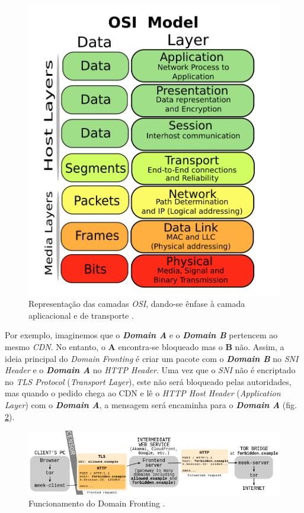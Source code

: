 \begin{figure}[H]
    \begin{center}
        \includegraphics[width=12cm]{img/OSI.png}
        \caption{Representação das camadas \textit{OSI}, dando-se ênfase à camada aplicacional e de transporte \cite{OSI}.}
        \label{diagram:OSI}
    \end{center}
\end{figure}

Por exemplo, imaginemos que o \textbf{\textit{Domain A}} e o \textbf{\textit{Domain B}} pertencem ao mesmo \textit{CDN}. No entanto, o \textbf{A} encontra-se bloqueado mas o \textbf{B} não. Assim, a ideia principal do \textit{Domain Fronting} é criar um pacote com o \textbf{\textit{Domain B}} no \textit{SNI Header} e o \textbf{\textit{Domain A}} no \textit{HTTP Header}. Uma vez que o \textit{SNI} não é encriptado no \textit{TLS Protocol} (\textit{Transport Layer}), este não será bloqueado pelas autoridades, mas quando o pedido chega ao CDN e lê o \textit{HTTP Host Header} (\textit{Application Layer}) com o \textbf{\textit{Domain A}}, a mensagem será encaminha para o \textbf{\textit{Domain A}} (fig. \ref{diagram:domainFronting}).

\begin{figure}[H]
    \begin{center}
        \includegraphics[width=15cm]{img/domainFronting.png}
        \caption{Funcionamento do Domain Fronting \cite{df}.}
        \label{diagram:domainFronting}
    \end{center}
\end{figure}


